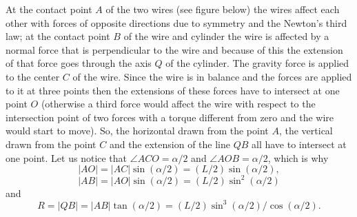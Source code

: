 \documentclass[11pt]{article}
\begin{document}
\solueng
At the contact point $A$ of the two wires (see figure below) the wires affect each other with forces of opposite directions due to symmetry and the Newton’s third law; at the contact point $B$ of the wire and cylinder the wire is affected by a normal force that is perpendicular to the wire and because of this the extension of that force goes through the axis $Q$ of the cylinder. The gravity force is applied to the center $C$ of the wire. Since the wire is in balance and the forces are applied to it at three points then the extensions of these forces have to intersect at one point $O$ (otherwise a third force would affect the wire with respect to the intersection point of two forces with a torque different from zero and the wire would start to move). So, the horizontal drawn from the point $A$, the vertical drawn from the point $C$ and the extension of the line $QB$ all have to intersect at one point. Let us notice that $\angle ACO=\alpha/2$ and $\angle AOB=\alpha/2$, which is why
$$|AO|=|AC|\sin(\alpha/2)=(L/2)\sin(\alpha/2),$$
$$|AB|=|AO|\sin(\alpha/2)=(L/2)\sin^2(\alpha/2)$$
and
$$R=|QB|=|AB|\tan(\alpha/2)=(L/2)\sin^3(\alpha/2)/\cos(\alpha/2).$$
\begin{center}
\end{center}
\end{document}
